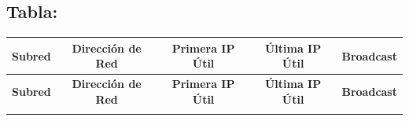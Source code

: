 \documentclass[letterpaper,12pt]{article}
\begin{document}
    \subsection{Tabla:}

    \begin{longtable}{|c|c|c|c|c|}
        \hline
        \textbf{Subred} & \textbf{Dirección de Red} & \textbf{Primera IP Útil} & \textbf{Última IP Útil} & \textbf{Broadcast} \\ \hline
        \endfirsthead

        \hline
        \textbf{Subred} & \textbf{Dirección de Red} & \textbf{Primera IP Útil} & \textbf{Última IP Útil} & \textbf{Broadcast} \\ \hline
        \endhead

        \endfoot

        \hline
        \endlastfoot


\end{longtable}
\end{document}
